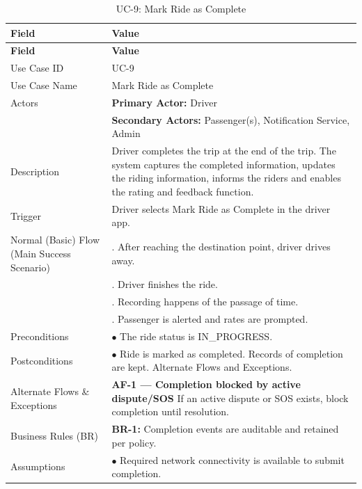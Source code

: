 \begin{longtable}{|>{\raggedright\arraybackslash}p{4cm}|>{\raggedright\arraybackslash}p{11cm}|}
\caption{UC-9: Mark Ride as Complete}
\label{tab:uc-9} \\
\hline
\rowcolor{lightgray!30}
\textbf{Field} & \textbf{Value} \\
\hline
\endfirsthead
\hline
\rowcolor{lightgray!30}
\textbf{Field} & \textbf{Value} \\
\hline
\endhead
\hline
\endfoot
\hline
\endlastfoot
Use Case ID & UC-9 \\
\hline
Use Case Name & Mark Ride as Complete \\
\hline
Actors & \textbf{Primary Actor:} Driver \\
& \textbf{Secondary Actors:} Passenger(s), Notification Service, Admin \\
\hline
Description & Driver completes the trip at the end of the trip. The system captures the completed information, updates the riding information, informs the riders and enables the rating and feedback function. \\
\hline
Trigger & Driver selects Mark Ride as Complete in the driver app. \\
\hline
Normal (Basic) Flow (Main Success Scenario) & 1. After reaching the destination point, driver drives away. \\
& 2. Driver finishes the ride. \\
& 3. Recording happens of the passage of time. \\
& 4. Passenger is alerted and rates are prompted. \\
\hline
Preconditions & $\bullet$ The ride status is IN_PROGRESS. \\
\hline
Postconditions & $\bullet$ Ride is marked as completed. Records of completion are kept. Alternate Flows and Exceptions. \\
\hline
Alternate Flows \& Exceptions & \textbf{AF-1 — Completion blocked by active dispute/SOS} \newline If an active dispute or SOS exists, block completion until resolution. \\
\hline
Business Rules (BR) & \textbf{BR-1:} Completion events are auditable and retained per policy. \\
\hline
Assumptions & $\bullet$ Required network connectivity is available to submit completion. \\
\end{longtable}

